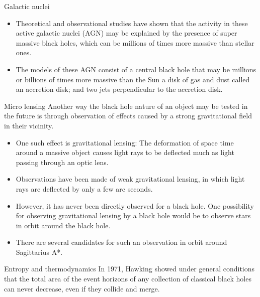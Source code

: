 \documentclass[20pt]{beamer}
\begin{document}
\begin{frame}[t]
\begin{columns}[t]
\begin{column}{0.32\linewidth}
\begin{block}{Galactic nuclei}
\begin{itemize}
\item Theoretical and observational studies have shown that the activity in these active galactic nuclei (AGN) may be explained by the presence of super massive black holes, which can be millions of times more massive than stellar ones.

\item The models of these AGN consist of a central black hole that may be millions or billions of times more massive than the Sun a disk of gas and dust called an accretion disk; and two jets perpendicular to the accretion disk.

\end{itemize}	
	 
\end{block}

\begin{block}{Micro lensing}
Another way the black hole nature of an object may be tested in the future is through observation of effects caused by a strong gravitational field in their vicinity. 

\begin{itemize}

\item One such effect is gravitational lensing: The deformation of space time around a massive object causes light rays to be deflected much as light passing through an optic lens.

\item Observations have been made of weak gravitational lensing, in which light rays are deflected by only a few arc seconds.

\item However, it has never been directly observed for a black hole. One possibility for observing gravitational lensing by a black hole would be to observe stars in orbit around the black hole.

\item  There are several candidates for such an observation in orbit around Sagittarius A*.

\end{itemize}

\end{block}

\begin{block}{Entropy and thermodynamics}
In 1971, Hawking showed under general conditions that the total area of the event horizons of any collection of classical black holes can never decrease, even if they collide and merge.


\end{block}
\end{column}
\end{columns}
\end{frame}
\end{document}
